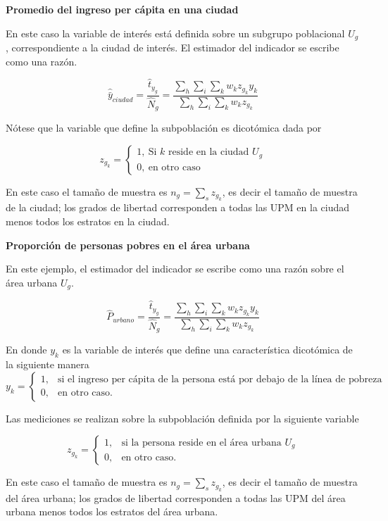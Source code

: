 \documentclass[
  12pt,
  spanish,
]{book}
\begin{document}
\textbf{Promedio del ingreso per cápita en una ciudad}

En este caso la variable de interés está definida sobre un subgrupo poblacional \(U_g\), correspondiente a la ciudad de interés. El estimador del indicador se escribe como una razón.

\[
\hat {\bar y}_{ciudad}= \frac{\hat t_{y_g}}{\hat N_g} =\frac{\sum_h\sum_i\sum_k w_kz_{g_k}y_{k}}{\sum_h\sum_i\sum_k w_kz_{g_k}}
\]

Nótese que la variable que define la subpoblación es dicotómica dada por

\[ 
z_{g_k}=
\begin{cases}
1, \ \text{Si $k$ reside en la ciudad $U_g$} \\
0, \ \text{en otro caso}
\end{cases}
\]

En este caso el tamaño de muestra es \(n_g = \sum_s z_{g_k}\), es decir el tamaño de muestra de la ciudad; los grados de libertad corresponden a todas las UPM en la ciudad menos todos los estratos en la ciudad.

\textbf{Proporción de personas pobres en el área urbana}

En este ejemplo, el estimador del indicador se escribe como una razón sobre el área urbana \(U_g\).

\[
\hat{P}_{urbano} = \frac{\hat t_{y_g}}{\hat N_g} =\frac{\sum_h\sum_i\sum_k w_kz_{g_k}y_{k}}{\sum_h\sum_i\sum_k w_kz_{g_k}}
\]

En donde \(y_{k}\) es la variable de interés que define una característica dicotómica de la siguiente manera
\[
y_k=
\begin{cases}
1, &\text{si el ingreso per cápita de la persona está por debajo de la línea de pobreza}\\
0, &\text{en otro caso.}
\end{cases}
\]

Las mediciones se realizan sobre la subpoblación definida por la siguiente variable

\[
z_{g_k}=
\begin{cases}
1, &\text{si la persona reside en el área urbana $U_g$}\\
0, &\text{en otro caso.}
\end{cases}
\]

En este caso el tamaño de muestra es \(n_g = \sum_s z_{g_k}\), es decir el tamaño de muestra del área urbana; los grados de libertad corresponden a todas las UPM del área urbana menos todos los estratos del área urbana.
\end{document}
